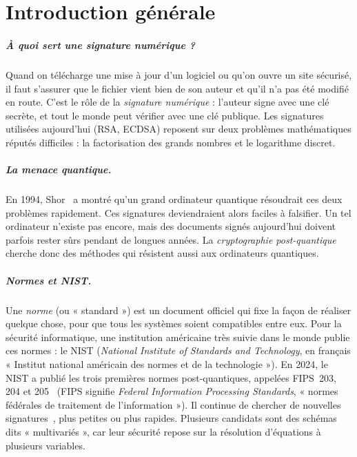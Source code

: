 \let\textcircled=\pgftextcircled
\chapter*{Introduction générale}
\label{ch:intro}

\paragraph{À quoi sert une signature numérique ?} Quand on télécharge une mise à jour d'un logiciel ou qu'on ouvre un site sécurisé, il faut s'assurer que le fichier vient bien de son auteur et qu'il n'a pas été modifié en route. C'est le rôle de la \emph{signature numérique} : l'auteur signe avec une clé secrète, et tout le monde peut vérifier avec une clé publique. Les signatures utilisées aujourd'hui (RSA, ECDSA) reposent sur deux problèmes mathématiques réputés difficiles : la factorisation des grands nombres et le logarithme discret.

\paragraph{La menace quantique.} En 1994, Shor~\cite{shor} a montré qu'un grand ordinateur quantique résoudrait ces deux problèmes rapidement. Ces signatures deviendraient alors faciles à falsifier. Un tel ordinateur n'existe pas encore, mais des documents signés aujourd'hui doivent parfois rester sûrs pendant de longues années. La \emph{cryptographie post-quantique} cherche donc des méthodes qui résistent aussi aux ordinateurs quantiques.

\paragraph{Normes et NIST.} Une \emph{norme} (ou « standard ») est un document officiel qui fixe la façon de réaliser quelque chose, pour que tous les systèmes soient compatibles entre eux. Pour la sécurité informatique, une institution américaine très suivie dans le monde publie ces normes : le NIST (\emph{National Institute of Standards and Technology}, en français « Institut national américain des normes et de la technologie »). En 2024, le NIST a publié les trois premières normes post-quantiques, appelées FIPS~203, 204 et 205~\cite{nistfips} (FIPS signifie \emph{Federal Information Processing Standards}, « normes fédérales de traitement de l'information »). Il continue de chercher de nouvelles signatures~\cite{nistadd}, plus petites ou plus rapides. Plusieurs candidats sont des schémas dits « multivariés », car leur sécurité repose sur la résolution d'équations à plusieurs variables.

